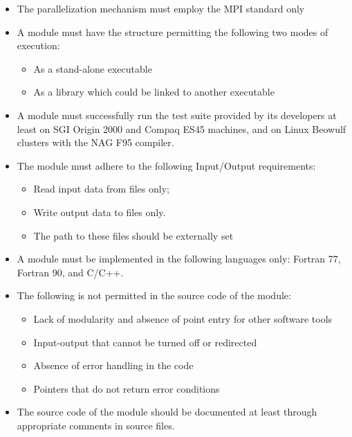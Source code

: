 \begin{itemize}
\item The parallelization mechanism must employ the MPI standard only
\item A module must have the structure permitting the following two modes of execution:

   \begin{itemize}
   \item As a stand-alone executable
   \item As a library which could be linked to another executable
   \end{itemize}

\item A module must successfully run the test suite provided by its
developers at least  on SGI Origin 2000 and
Compaq ES45 machines, and
on Linux Beowulf clusters with the NAG F95 compiler.

\item The module must adhere to the following Input/Output requirements:

    \begin{itemize}
    \item Read input data from files only;
    \item Write output data to files only.
    \item The path to these files should be externally set
    \end{itemize}

\item A module must be implemented in the following languages only: Fortran 77, Fortran 90, and C/C++.

\item The following is not permitted in the source code of the module:

    \begin{itemize}
    \item Lack of modularity and absence of point entry for other software tools
    \item Input-output that cannot be turned off or redirected
    \item Absence of error handling in the code
    \item Pointers that do not return error conditions
\end{itemize}

\item The source code of the module should be documented at least through appropriate 
comments in source files.
\end{itemize}


